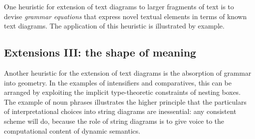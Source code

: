 One heuristic for extension of text diagrams to larger fragments of text is to devise \emph{grammar equations} that express novel textual elements in terms of known text diagrams. The application of this heuristic is illustrated by example.


\begin{example}[\texttt{School bores Bob} = \texttt{Bob \underline{is bored by} school}]

\end{example}


\begin{example}[\texttt{Red car} = \texttt{Car is red}]

\end{example}


\begin{example}[\texttt{Bob\underline{'s} pub} = \texttt{Pub that Bob owns}]

\end{example}

\subsection{Extensions III: the shape of meaning}

Another heuristic for the extension of text diagrams is the absorption of grammar into geometry. In the examples of intensifiers and comparatives, this can be arranged by exploiting the implicit type-theoretic constraints of nesting boxes. The example of noun phrases illustrates the higher principle that the particulars of interpretational choices into string diagrams are inessential: any consistent scheme will do, because the role of string diagrams is to give voice to the computational content of dynamic semantics.


\begin{example}

\end{example}


\begin{example}

\end{example}

